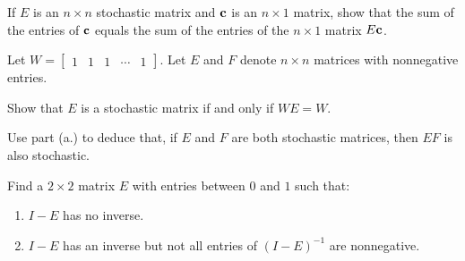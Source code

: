 \documentclass{ximera}
\begin{document}
\begin{problem}\label{prob:i/o_7}
If $E$ is an $n \times n$ stochastic matrix and ${\bf c}$ is an $n \times 1$ matrix, show that the sum of the entries of ${\bf c}$ equals the sum of the entries of the $n \times 1$ matrix $E{\bf c}$.
\end{problem}

\begin{problem}\label{prob:i/o_8}
Let $W = \begin{bmatrix}
1 & 1 & 1 & \cdots & 1
\end{bmatrix}$. Let $E$ and $F$ denote $n \times n$ matrices with nonnegative entries.

\begin{problem}\label{prob:i/o_9}
Show that $E$ is a stochastic matrix if and only if $WE = W$.
\end{problem} 

\begin{problem}\label{prob:i/o_10}
Use part (a.) to deduce that, if $E$ and $F$ are both stochastic matrices, then $EF$ is also stochastic.
\end{problem} 

\end{problem}

\begin{problem}
Find a $2 \times 2$ matrix $E$ with entries between $0$ and $1$ such that:

\begin{enumerate}
\item\label{prob:i/o_11} $I - E$ has no inverse.

\item\label{prob:i/o_12} $I - E$ has an inverse but not all entries of $(I - E)^{-1}$ are nonnegative.

\end{enumerate}

\end{problem}
\end{document}
